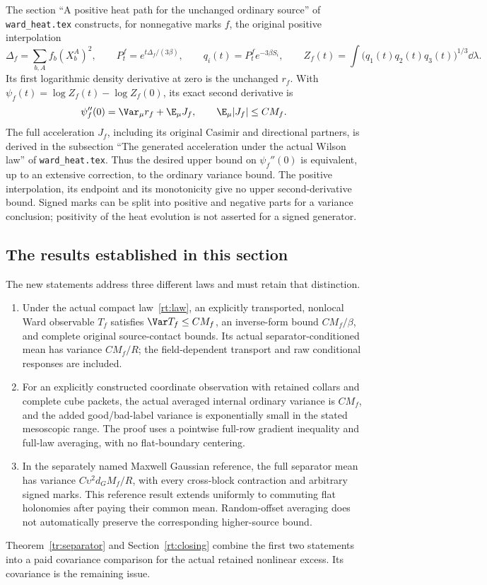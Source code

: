 The section ``A positive heat path for the unchanged ordinary source'' of \texttt{ward\_heat.tex} constructs, for nonnegative marks \(f\), the original positive interpolation
\[
 \Delta_f=\sum_{b,A}f_b(X_b^A)^2,\qquad
 P_t^f=e^{t\Delta_f/(3\beta)},\qquad
 q_i(t)=P_t^f e^{-3\beta S_i},\qquad
 Z_f(t)=\int\bigl(q_1(t)q_2(t)q_3(t)\bigr)^{1/3}\dd\lambda .
\]
Its first logarithmic density derivative at zero is the unchanged \(r_f\). With
\(\psi_f(t)=\log Z_f(t)-\log Z_f(0)\), its exact second derivative is
\begin{equation}
 \psi_f''(0)=\Var_\mu r_f+\E_\mu J_f,\qquad
 \E_\mu|J_f|\le CM_f .
 \label{rt:heat}
\end{equation}
The full acceleration \(J_f\), including its original Casimir and directional partners, is derived in the subsection ``The generated acceleration under the actual Wilson law'' of \texttt{ward\_heat.tex}. Thus the desired upper bound on \(\psi_f''(0)\) is equivalent, up to an extensive correction, to the ordinary variance bound. The positive interpolation, its endpoint and its monotonicity give no upper second-derivative bound. Signed marks can be split into positive and negative parts for a variance conclusion; positivity of the heat evolution is not asserted for a signed generator.

\subsection{The results established in this section}

The new statements address three different laws and must retain that distinction.

\begin{enumerate}
 \item Under the actual compact law~\eqref{rt:law}, an explicitly transported, nonlocal Ward observable \(T_f\) satisfies \(\Var T_f\le CM_f\), an inverse-form bound \(CM_f/\beta\), and complete original source-contact bounds. Its actual separator-conditioned mean has variance \(CM_f/R\); the field-dependent transport and raw conditional responses are included.
 \item For an explicitly constructed coordinate observation with retained collars and complete cube packets, the actual averaged internal ordinary variance is \(CM_f\), and the added good/bad-label variance is exponentially small in the stated mesoscopic range. The proof uses a pointwise full-row gradient inequality and full-law averaging, with no flat-boundary centering.
 \item In the separately named Maxwell Gaussian reference, the full separator mean has variance \(C\upsilon^2 d_GM_f/R\), with every cross-block contraction and arbitrary signed marks. This reference result extends uniformly to commuting flat holonomies after paying their common mean. Random-offset averaging does not automatically preserve the corresponding higher-source bound.
\end{enumerate}

Theorem~\ref{tr:separator} and Section~\ref{rt:closing} combine the first two statements into a paid covariance comparison for the actual retained nonlinear excess. Its covariance is the remaining issue.
